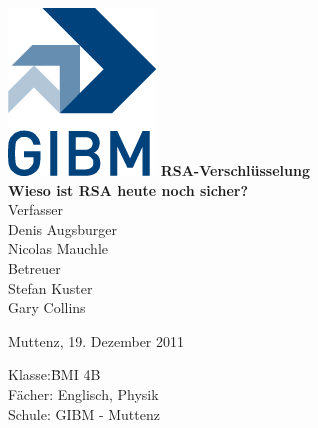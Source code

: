 \begin{titlepage}
\sffamily
\centering
\includegraphics{images/gibm_logo.png}
\vfill
{\bfseries\Huge RSA-Verschlüsselung}\\
\vfill
{\bfseries\Large Wieso ist RSA heute noch sicher?}\\
\vfill
Verfasser\\[1ex]
Denis Augsburger\\
Nicolas Mauchle\\
\vfill
Betreuer\\[1ex]
{\large Stefan Kuster}\\
{\large Gary Collins}\\
\vfill
\raggedright
\small
Muttenz, 19. Dezember 2011\\[2cm]
\begin{tabbing}
Klasse:\quad\quad\quad \=BMI 4B\\
Fächer: \> Englisch, Physik \\
Schule: \> GIBM - Muttenz
\end{tabbing}
\end{titlepage}
